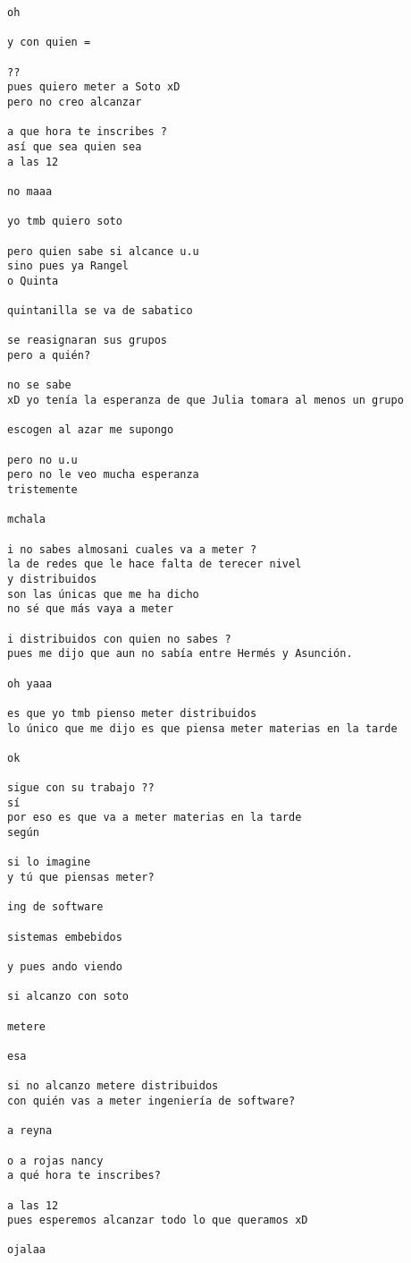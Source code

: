 \begin{verbatim}
oh 

y con quien =

??
pues quiero meter a Soto xD
pero no creo alcanzar

a que hora te inscribes ?
así que sea quien sea
a las 12

no maaa

yo tmb quiero soto

pero quien sabe si alcance u.u
sino pues ya Rangel
o Quinta

quintanilla se va de sabatico

se reasignaran sus grupos
pero a quién?

no se sabe
xD yo tenía la esperanza de que Julia tomara al menos un grupo

escogen al azar me supongo

pero no u.u
pero no le veo mucha esperanza
tristemente

mchala

i no sabes almosani cuales va a meter ?
la de redes que le hace falta de terecer nivel
y distribuidos
son las únicas que me ha dicho
no sé que más vaya a meter

i distribuidos con quien no sabes ?
pues me dijo que aun no sabía entre Hermés y Asunción.

oh yaaa

es que yo tmb pienso meter distribuidos
lo único que me dijo es que piensa meter materias en la tarde

ok 

sigue con su trabajo ??
sí
por eso es que va a meter materias en la tarde
según

si lo imagine
y tú que piensas meter?

ing de software

sistemas embebidos

y pues ando viendo

si alcanzo con soto

metere

esa

si no alcanzo metere distribuidos
con quién vas a meter ingeniería de software?

a reyna

o a rojas nancy
a qué hora te inscribes?

a las 12
pues esperemos alcanzar todo lo que queramos xD

ojalaa
\end{verbatim}